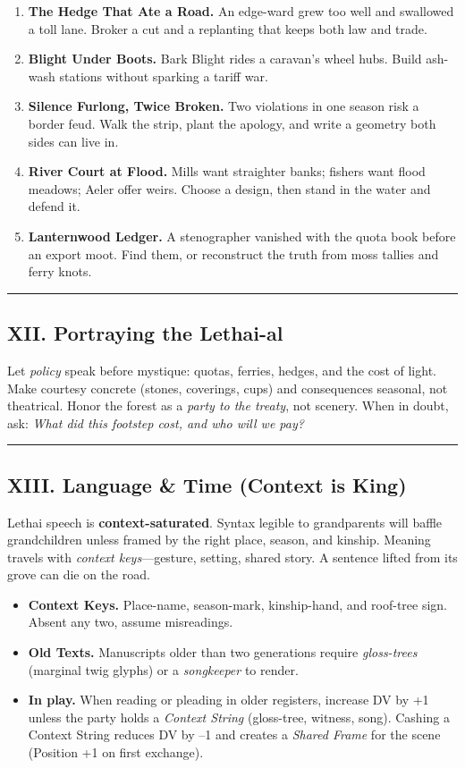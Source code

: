 \documentclass[11pt]{article}
\begin{document}
\begin{enumerate}[leftmargin=*]
  \item \textbf{The Hedge That Ate a Road.} An edge-ward grew too well and swallowed a toll lane. Broker a cut and a replanting that keeps both law and trade.
  \item \textbf{Blight Under Boots.} Bark Blight rides a caravan's wheel hubs. Build ash-wash stations without sparking a tariff war.
  \item \textbf{Silence Furlong, Twice Broken.} Two violations in one season risk a border feud. Walk the strip, plant the apology, and write a geometry both sides can live in.
  \item \textbf{River Court at Flood.} Mills want straighter banks; fishers want flood meadows; Aeler offer weirs. Choose a design, then stand in the water and defend it.
  \item \textbf{Lanternwood Ledger.} A stenographer vanished with the quota book before an export moot. Find them, or reconstruct the truth from moss tallies and ferry knots.
\end{enumerate}

\medskip\hrule\medskip

\subsection{XII. Portraying the Lethai-al}

Let \emph{policy} speak before mystique: quotas, ferries, hedges, and the cost of light. Make courtesy concrete (stones, coverings, cups) and consequences seasonal, not theatrical. Honor the forest as a \emph{party to the treaty}, not scenery. When in doubt, ask: \emph{What did this footstep cost, and who will we pay?}

\medskip\hrule\medskip

\subsection{XIII. Language \& Time (Context is King)}

Lethai speech is \textbf{context-saturated}. Syntax legible to grandparents will baffle grandchildren unless framed by the right place, season, and kinship. Meaning travels with \emph{context keys}---gesture, setting, shared story. A sentence lifted from its grove can die on the road.

\begin{itemize}[leftmargin=*]
  \item \textbf{Context Keys.} Place-name, season-mark, kinship-hand, and roof-tree sign. Absent any two, assume misreadings.
  \item \textbf{Old Texts.} Manuscripts older than two generations require \emph{gloss-trees} (marginal twig glyphs) or a \emph{songkeeper} to render.
  \item \textbf{In play.} When reading or pleading in older registers, increase DV by +1 unless the party holds a \emph{Context String} (gloss-tree, witness, song). Cashing a Context String reduces DV by --1 and creates a \emph{Shared Frame} for the scene (Position +1 on first exchange).
\end{itemize}
\end{document}
